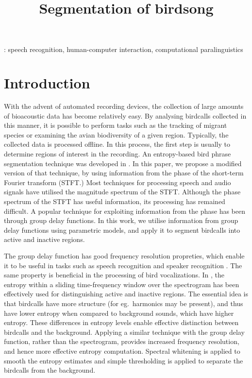 \documentclass[a4paper]{article}
\title{Segmentation of birdsong}
\begin{document}
  \maketitle
  \begin{abstract}
  \end{abstract}
  : speech recognition, human-computer interaction, computational paralinguistics



\section{Introduction}

With the advent of automated recording devices, the collection of large amounts of
bioacoustic data has become relatively easy. By analysing birdcalls collected in
this manner, it is possible to perform tasks such as the tracking of migrant
species or examining the avian biodiversity of a given region. Typically, the
collected data is processed offline. In this process, the first step is usually to
determine regions of interest in the recording. An entropy-based bird phrase segmentation
technique was developed in \cite{wang2013}. In this paper, we propose a modified
version of that technique, by using information from the phase of the short-term
Fourier transform (STFT.) Most techniques for processing speech and audio signals have
utilised the magnitude spectrum of the STFT. Although the phase spectrum of the STFT has 
useful information, its processing has remained difficult. A popular technique
for exploiting information from the phase has been through group delay functions. In
this work, we utilise information from group delay functions using parametric
models, and apply it to segment birdcalls into active and inactive regions.

The group delay function has good frequency resolution propreties, which enable
it to be useful in tasks such as speech recognition and speaker recognition
\cite{hema,padman}. The same property is beneficial in the processing of bird
vocalizations. In \cite{wang2013}, the entropy within a sliding time-frequency
window over the spectrogram has been effectively used for distinguishing active
and inactive regions. The essential idea is that birdcalls have more structure
(for eg.~harmonics may be present), and thus have lower entropy when compared to
 background sounds, which have higher entropy. These differences in entropy
levels enable effective distinction between birdcalls and the background.
Applying a similar technique with the group delay function, rather than the
spectrogram, provides increased frequency resolution, and hence more effective
entropy computation. Spectral whitening is applied to smooth the entropy
estimates and simple thresholding is applied to separate the birdcalls from 
the background.
\end{document}
